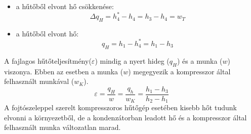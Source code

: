 \begin{itemize}
	\item a hűtőből elvont hő csökkenése:\begin{equation*}
		\Delta q_H=h_4^*-h_4=h_3-h_4=w_T
	\end{equation*}
	\item a hűtőből elvont hő:\begin{equation*}
		q_H=h_1-h_4^*=h_1-h_3
	\end{equation*}
\end{itemize}
A fajlagos hűtőteljesítmény($\varepsilon$)  mindig a nyert hideg ($q_H$) és a munka ($w$) viszonya. Ebben az esetben a munka ($w$) megegyezik a kompresszor által felhasznált munkával ($w_K$).
\begin{equation*}
	\varepsilon= \dfrac{q_{H}}{w}=\dfrac{q_h}{w_K}=\dfrac{h_1-h_3}{h_2-h_1}
\end{equation*}
A fojtószeleppel szerelt kompresszoros hűtőgép esetében kisebb hőt tudunk elvonni a környezetből, de a kondenzátorban leadott hő és a kompresszor által felhasznált munka változatlan marad.


\pagebreak